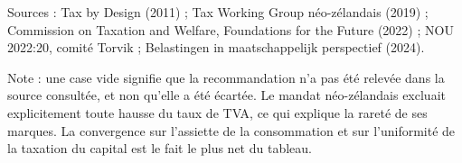 Sources : Tax by Design (2011) ; Tax Working Group néo-zélandais (2019) ; Commission on Taxation and Welfare, Foundations for the Future (2022) ; NOU 2022:20, comité Torvik ; Belastingen in maatschappelijk perspectief (2024).\par Note : une case vide signifie que la recommandation n'a pas été relevée dans la source consultée, et non qu'elle a été écartée. Le mandat néo-zélandais excluait explicitement toute hausse du taux de TVA, ce qui explique la rareté de ses marques. La convergence sur l'assiette de la consommation et sur l'uniformité de la taxation du capital est le fait le plus net du tableau.
